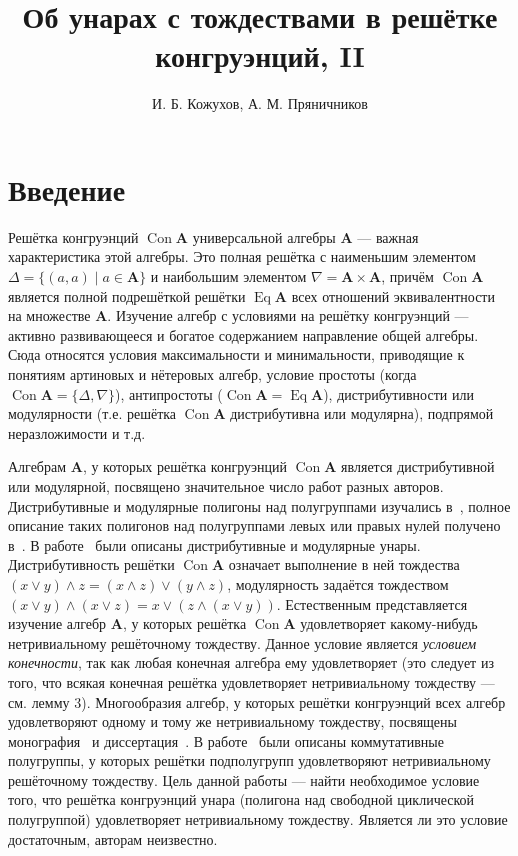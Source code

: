 \documentclass[11pt,twoside,draft
]{article}
\title
{%
Об унарах с тождествами в решётке конгруэнций, II}
{%
On unars with identities in congruence lattice, II}
\author
{%
И. Б. Кожухов, А. М. Пряничников}
{%
I. B. Kozhukhov, A. M. Pryanichnikov}
\def\Con{\operatorname{Con}}
\def\Eq{\operatorname{Eq}}
\begin{document}
\maketitle

\enmaketitle

\section{Введение}

Решётка конгруэнций $\Con \mathbf{A}$ универсальной алгебры $\mathbf{A}$ — важная характеристика этой алгебры.
Это полная решётка с наименьшим элементом $\Delta = \{ (a,a) \mid a \in \mathbf{A} \}$ и наибольшим элементом $\nabla = \mathbf{A} \times \mathbf{A}$, причём $\Con \mathbf{A}$ является полной подрешёткой решётки $\Eq \mathbf{A}$ всех отношений эквивалентности на множестве $\mathbf{A}$.
Изучение алгебр с условиями на решётку конгруэнций — активно развивающееся и богатое содержанием направление общей алгебры.
Сюда относятся условия максимальности и минимальности, приводящие к понятиям артиновых и нётеровых алгебр, условие простоты (когда $\Con \mathbf{A} = \{ \Delta, \nabla \}$), антипростоты ($\Con \mathbf{A} = \Eq \mathbf{A}$), дистрибутивности или модулярности (т.е. решётка $\Con \mathbf{A}$ дистрибутивна или модулярна), подпрямой неразложимости и т.д.

Алгебрам $\mathbf{A}$, у которых решётка конгруэнций $\Con \mathbf{A}$ является дистрибутивной или модулярной, посвящено значительное число работ разных авторов. 
Дистрибутивные и модулярные полигоны над полугруппами изучались в~\cite{Ptakhov_2}, полное описание таких полигонов над полугруппами левых или правых нулей получено в~\cite{Khaliullina_3}. 
В работе~\cite{Egorova_4} были описаны дистрибутивные и модулярные унары.
Дистрибутивность решётки $\Con \mathbf{A}$ означает выполнение в ней тождества $ (x \vee y) \wedge z = (x \wedge z) \vee (y \wedge z) $, модулярность задаётся тождеством $ (x \vee y) \wedge (x \vee z) = x \vee (z \wedge (x \vee y)) $.
Естественным представляется изучение алгебр $\mathbf{A}$, у которых решётка $\Con \mathbf{A}$ удовлетворяет какому-нибудь нетривиальному решёточному тождеству.
Данное условие является \textit{условием конечности}, так как любая конечная алгебра ему удовлетворяет (это следует из того, что всякая конечная решётка удовлетворяет нетривиальному тождеству — см. лемму 3).
Многообразия алгебр, у которых решётки конгруэнций всех алгебр удовлетворяют одному и тому же нетривиальному тождеству, посвящены монография~\cite{Kearnes_5} и диссертация~\cite{Nation_6}.
В работе~\cite{Repnitsky_7} были описаны коммутативные полугруппы, у которых решётки подполугрупп удовлетворяют нетривиальному решёточному тождеству.
Цель данной работы — найти необходимое условие того, что решётка конгруэнций унара (полигона над свободной циклической полугруппой) удовлетворяет нетривиальному тождеству.
Является ли это условие достаточным, авторам неизвестно.
\end{document}

